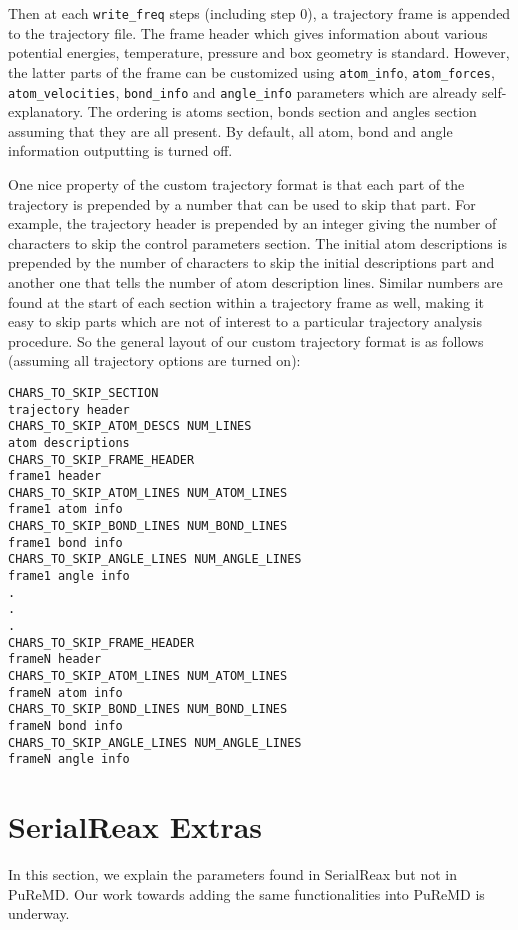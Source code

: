 \documentclass{article}
\begin{document}
Then at each {\tt write\_freq} steps (including step 0), a trajectory 
frame is appended to the trajectory file.  The frame header which gives 
information about various potential energies, temperature, pressure and 
box geometry is standard. However, the latter parts of the frame can be 
customized using {\tt atom\_info}, {\tt atom\_forces}, {\tt atom\_velocities}, 
{\tt bond\_info} and {\tt angle\_info} parameters which are already
self-explanatory. The ordering is atoms section, bonds section and angles 
section assuming that they are all present. By default, all atom, bond and 
angle information outputting is turned off.

One nice property of the custom trajectory format is that each part of 
the trajectory is prepended by a number that can be used to skip that part.
For example, the trajectory header is prepended by an integer giving the 
number of characters to skip the control parameters section. The initial 
atom descriptions is prepended by the number of characters to skip the 
initial descriptions part and another one that tells the number of atom 
description lines. Similar numbers are found at the start of each section 
within a trajectory frame as well, making it easy to skip parts which are 
not of interest to a particular trajectory analysis procedure. So the 
general layout of our custom trajectory format is as follows (assuming 
all trajectory options are turned on):
\begin{verbatim}
CHARS_TO_SKIP_SECTION
trajectory header
CHARS_TO_SKIP_ATOM_DESCS NUM_LINES
atom descriptions
CHARS_TO_SKIP_FRAME_HEADER
frame1 header
CHARS_TO_SKIP_ATOM_LINES NUM_ATOM_LINES
frame1 atom info
CHARS_TO_SKIP_BOND_LINES NUM_BOND_LINES
frame1 bond info
CHARS_TO_SKIP_ANGLE_LINES NUM_ANGLE_LINES
frame1 angle info
.
.
.
CHARS_TO_SKIP_FRAME_HEADER
frameN header
CHARS_TO_SKIP_ATOM_LINES NUM_ATOM_LINES
frameN atom info
CHARS_TO_SKIP_BOND_LINES NUM_BOND_LINES
frameN bond info
CHARS_TO_SKIP_ANGLE_LINES NUM_ANGLE_LINES
frameN angle info
\end{verbatim}


\section{SerialReax Extras}
\label{sec:serialreax_extras}

In this section, we explain the parameters found in SerialReax but not in
PuReMD. Our work towards adding the same functionalities into PuReMD is 
underway.
\end{document}
